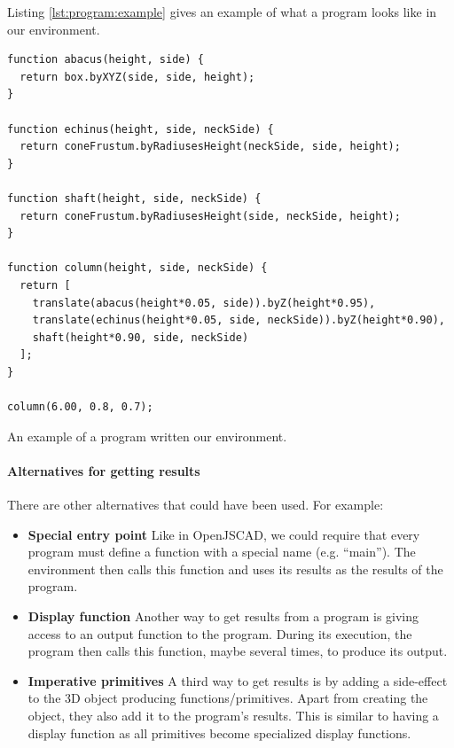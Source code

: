 Listing \ref{lst:program:example} gives an example of what a program looks like in our environment.

\begin{listing}
\begin{verbatim}
function abacus(height, side) {
  return box.byXYZ(side, side, height);
}

function echinus(height, side, neckSide) {
  return coneFrustum.byRadiusesHeight(neckSide, side, height);
}

function shaft(height, side, neckSide) {
  return coneFrustum.byRadiusesHeight(side, neckSide, height);
}

function column(height, side, neckSide) {
  return [
    translate(abacus(height*0.05, side)).byZ(height*0.95),
    translate(echinus(height*0.05, side, neckSide)).byZ(height*0.90),
    shaft(height*0.90, side, neckSide)
  ];
}

column(6.00, 0.8, 0.7);
\end{verbatim}
\caption{An example of a program written our environment.}
\label{lst:program:example}
\end{listing}


\paragraph{Alternatives for getting results}
There are other alternatives that could have been used.
For example:
\begin{itemize}
  \item {\bf Special entry point} Like in OpenJSCAD, we could require that every program must define a function with a special name (e.g. ``main''). The environment then calls this function and uses its results as the results of the program.
  \item {\bf Display function} Another way to get results from a program is giving access to an output function to the program. During its execution, the program then calls this function, maybe several times, to produce its output.
  \item {\bf Imperative primitives} A third way to get results is by adding a side-effect to the 3D object producing functions/primitives. Apart from creating the object, they also add it to the program's results. This is similar to having a display function as all primitives become specialized display functions.
\end{itemize}


